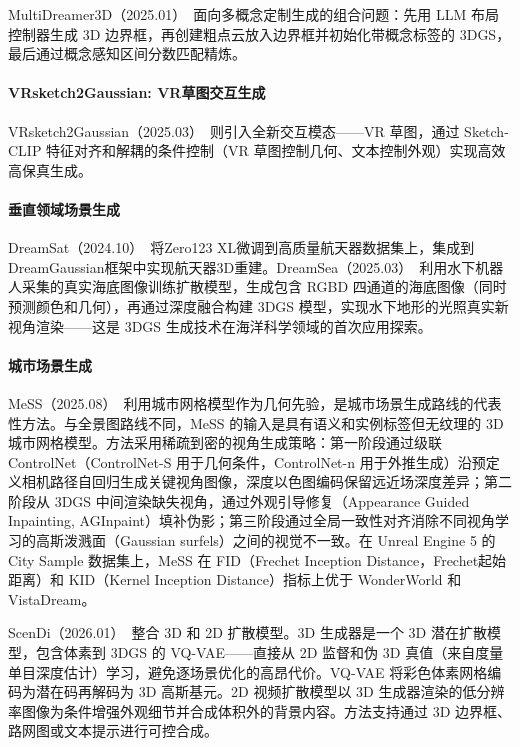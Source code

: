 MultiDreamer3D（2025.01）~\cite{2501_13449}面向多概念定制生成的组合问题：先用 LLM 布局控制器生成 3D 边界框，再创建粗点云放入边界框并初始化带概念标签的 3DGS，最后通过概念感知区间分数匹配精炼。

\paragraph{VRsketch2Gaussian: VR草图交互生成}

VRsketch2Gaussian（2025.03）~\cite{2503_12383}则引入全新交互模态——VR 草图，通过 Sketch-CLIP 特征对齐和解耦的条件控制（VR 草图控制几何、文本控制外观）实现高效高保真生成。

\paragraph{垂直领域场景生成}

DreamSat（2024.10）~\cite{2410_05097}将Zero123 XL微调到高质量航天器数据集上，集成到DreamGaussian框架中实现航天器3D重建。DreamSea（2025.03）~\cite{2503_06784}利用水下机器人采集的真实海底图像训练扩散模型，生成包含 RGBD 四通道的海底图像（同时预测颜色和几何），再通过深度融合构建 3DGS 模型，实现水下地形的光照真实新视角渲染——这是 3DGS 生成技术在海洋科学领域的首次应用探索。

\paragraph{城市场景生成}

MeSS（2025.08）~\cite{2508_15169}利用城市网格模型作为几何先验，是城市场景生成路线的代表性方法。与全景图路线不同，MeSS 的输入是具有语义和实例标签但无纹理的 3D 城市网格模型。方法采用稀疏到密的视角生成策略：第一阶段通过级联 ControlNet（ControlNet-S 用于几何条件，ControlNet-n 用于外推生成）沿预定义相机路径自回归生成关键视角图像，深度以色图编码保留远近场深度差异；第二阶段从 3DGS 中间渲染缺失视角，通过外观引导修复（Appearance Guided Inpainting, AGInpaint）填补伪影；第三阶段通过全局一致性对齐消除不同视角学习的高斯泼溅面（Gaussian surfels）之间的视觉不一致。在 Unreal Engine 5 的 City Sample 数据集上，MeSS 在 FID（Frechet Inception Distance，Frechet起始距离）和 KID（Kernel Inception Distance）指标上优于 WonderWorld 和 VistaDream。

ScenDi（2026.01）~\cite{2601_15221}整合 3D 和 2D 扩散模型。3D 生成器是一个 3D 潜在扩散模型，包含体素到 3DGS 的 VQ-VAE——直接从 2D 监督和伪 3D 真值（来自度量单目深度估计）学习，避免逐场景优化的高昂代价。VQ-VAE 将彩色体素网格编码为潜在码再解码为 3D 高斯基元。2D 视频扩散模型以 3D 生成器渲染的低分辨率图像为条件增强外观细节并合成体积外的背景内容。方法支持通过 3D 边界框、路网图或文本提示进行可控合成。

